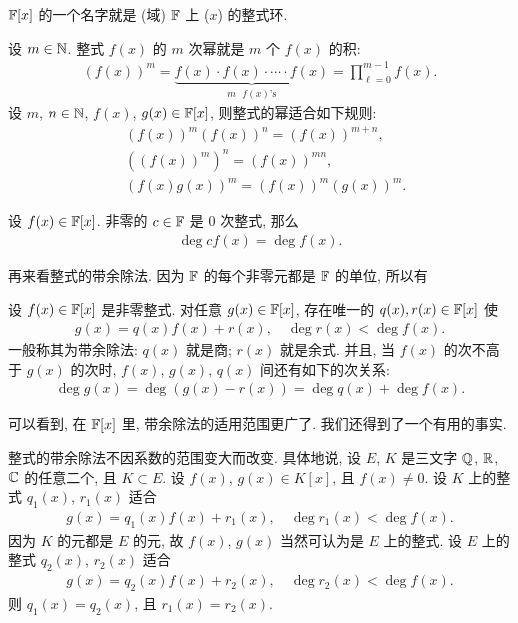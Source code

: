\begin{remark}
    $\mathbb{F}[x]$ 的一个名字就是 (域) $\mathbb{F}$ 上 ($x$) 的整式环.
\end{remark}

\begin{definition}
    设 $m \in \mathbb{N}$. 整式 $f(x)$ 的 $m$ 次幂就是 $m$ 个 $f(x)$ 的积:
    \begin{align*}
        (f(x))^m = \underbrace{f(x) \cdot f(x) \cdot \cdots \cdot f(x)}_{\text{$m$ $f(x)$'s}} = \prod_{\ell = 0}^{m-1} f(x).
    \end{align*}
    设 $m$, $n \in \mathbb{N}$, $f(x)$, $g(x) \in \mathbb{F}[x]$, 则整式的幂适合如下规则:
    \begin{align*}
         & (f(x))^m (f(x))^n = (f(x))^{m+n},  \\
         & ((f(x))^m)^n = (f(x))^{mn},        \\
         & (f(x) g(x))^m = (f(x))^m (g(x))^m.
    \end{align*}
\end{definition}

\begin{proposition}
    设 $f(x) \in \mathbb{F}[x]$. 非零的 $c \in \mathbb{F}$ 是 $0$ 次整式, 那么
    \begin{align*}
        \deg cf(x) = \deg f(x).
    \end{align*}
\end{proposition}

再来看整式的带余除法. 因为 $\mathbb{F}$ 的每个非零元都是 $\mathbb{F}$ 的单位, 所以有

\begin{proposition}
    设 $f(x) \in \mathbb{F}[x]$ 是非零整式. 对任意 $g(x) \in \mathbb{F}[x]$, 存在唯一的 $q(x), r(x) \in \mathbb{F}[x]$ 使
    \begin{align*}
        g(x) = q(x) f(x) + r(x), \quad \deg r(x) < \deg f(x).
    \end{align*}
    一般称其为带余除法: $q(x)$ 就是商; $r(x)$ 就是余式. 并且, 当 $f(x)$ 的次不高于 $g(x)$ 的次时, $f(x)$, $g(x)$, $q(x)$ 间还有如下的次关系:
    \begin{align*}
        \deg g(x) = \deg {(g(x) - r(x))} = \deg q(x) + \deg f(x).
    \end{align*}
\end{proposition}

可以看到, 在 $\mathbb{F}[x]$ 里, 带余除法的适用范围更广了. 我们还得到了一个有用的事实.

\begin{proposition}
    整式的带余除法不因系数的范围变大而改变. 具体地说, 设 $E$, $K$ 是三文字 $\mathbb{Q}$, $\mathbb{R}$, $\mathbb{C}$ 的任意二个, 且 $K \subset E$. 设 $f(x)$, $g(x) \in K[x]$, 且 $f(x) \neq 0$. 设 $K$ 上的整式 $q_1 (x)$, $r_1 (x)$ 适合
    \begin{align*}
        g(x) = q_1 (x) f(x) + r_1 (x), \quad \deg r_1 (x) < \deg f(x).
    \end{align*}
    因为 $K$ 的元都是 $E$ 的元, 故 $f(x)$, $g(x)$ 当然可认为是 $E$ 上的整式. 设 $E$ 上的整式 $q_2 (x)$, $r_2 (x)$ 适合
    \begin{align*}
        g(x) = q_2 (x) f(x) + r_2 (x), \quad \deg r_2 (x) < \deg f(x).
    \end{align*}
    则 $q_1 (x) = q_2 (x)$, 且 $r_1 (x) = r_2 (x)$.
\end{proposition}

